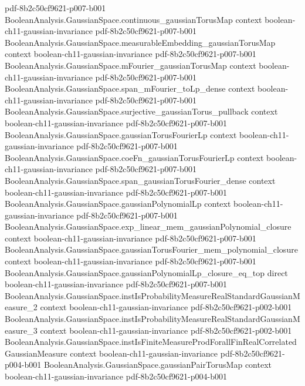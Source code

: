 \begin{theorem}
  {pdf-8b2c50cf9621-p007-b001}
\proofstep
  {BooleanAnalysis.GaussianSpace.continuous_gaussianTorusMap}
  {context}
  {boolean-ch11-gaussian-invariance}
  {pdf-8b2c50cf9621-p007-b001}
\proofstep
  {BooleanAnalysis.GaussianSpace.measurableEmbedding_gaussianTorusMap}
  {context}
  {boolean-ch11-gaussian-invariance}
  {pdf-8b2c50cf9621-p007-b001}
\proofstep
  {BooleanAnalysis.GaussianSpace.mFourier_gaussianTorusMap}
  {context}
  {boolean-ch11-gaussian-invariance}
  {pdf-8b2c50cf9621-p007-b001}
\proofstep
  {BooleanAnalysis.GaussianSpace.span_mFourier_toLp_dense}
  {context}
  {boolean-ch11-gaussian-invariance}
  {pdf-8b2c50cf9621-p007-b001}
\proofstep
  {BooleanAnalysis.GaussianSpace.surjective_gaussianTorus_pullback}
  {context}
  {boolean-ch11-gaussian-invariance}
  {pdf-8b2c50cf9621-p007-b001}
\proofstep
  {BooleanAnalysis.GaussianSpace.gaussianTorusFourierLp}
  {context}
  {boolean-ch11-gaussian-invariance}
  {pdf-8b2c50cf9621-p007-b001}
\proofstep
  {BooleanAnalysis.GaussianSpace.coeFn_gaussianTorusFourierLp}
  {context}
  {boolean-ch11-gaussian-invariance}
  {pdf-8b2c50cf9621-p007-b001}
\proofstep
  {BooleanAnalysis.GaussianSpace.span_gaussianTorusFourier_dense}
  {context}
  {boolean-ch11-gaussian-invariance}
  {pdf-8b2c50cf9621-p007-b001}
\proofstep
  {BooleanAnalysis.GaussianSpace.gaussianPolynomialLp}
  {context}
  {boolean-ch11-gaussian-invariance}
  {pdf-8b2c50cf9621-p007-b001}
\proofstep
  {BooleanAnalysis.GaussianSpace.exp_linear_mem_gaussianPolynomial_closure}
  {context}
  {boolean-ch11-gaussian-invariance}
  {pdf-8b2c50cf9621-p007-b001}
\proofstep
  {BooleanAnalysis.GaussianSpace.gaussianTorusFourier_mem_polynomial_closure}
  {context}
  {boolean-ch11-gaussian-invariance}
  {pdf-8b2c50cf9621-p007-b001}
\proofstep
  {BooleanAnalysis.GaussianSpace.gaussianPolynomialLp_closure_eq_top}
  {direct}
  {boolean-ch11-gaussian-invariance}
  {pdf-8b2c50cf9621-p007-b001}
\proofstep
  {BooleanAnalysis.GaussianSpace.instIsProbabilityMeasureRealStandardGaussianMeasure_2}
  {context}
  {boolean-ch11-gaussian-invariance}
  {pdf-8b2c50cf9621-p002-b001}
\proofstep
  {BooleanAnalysis.GaussianSpace.instIsProbabilityMeasureRealStandardGaussianMeasure_3}
  {context}
  {boolean-ch11-gaussian-invariance}
  {pdf-8b2c50cf9621-p002-b001}
\proofstep
  {BooleanAnalysis.GaussianSpace.instIsFiniteMeasureProdForallFinRealCorrelatedGaussianMeasure}
  {context}
  {boolean-ch11-gaussian-invariance}
  {pdf-8b2c50cf9621-p004-b001}
\proofstep
  {BooleanAnalysis.GaussianSpace.gaussianPairTorusMap}
  {context}
  {boolean-ch11-gaussian-invariance}
  {pdf-8b2c50cf9621-p004-b001}
\proofstep

\end{theorem}
